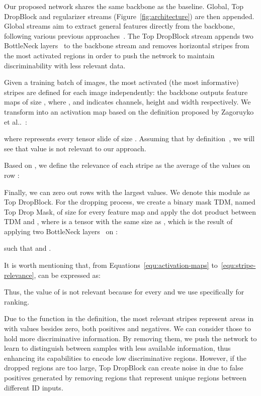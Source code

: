 \documentclass[a4paper,conference]{IEEEtran}
\makeatletter
\DeclareRobustCommand\onedot{\futurelet\@let@token\@onedot}
\def\@onedot{\ifx\@let@token.\else.\null\fi\xspace}
\def\etal{et al\onedot}
\makeatother
\begin{document}
Our proposed network shares the same backbone as the baseline. Global, Top DropBlock and regularizer streams (Figure~\ref{fig:architecture}) are then appended. Global streams aim to extract general features directly from the backbone, following various previous approaches~\cite{quispe2019improved,dai2019batch,luo2019bag}. The Top DropBlock stream appends two BottleNeck layers~\cite{he2016deep} to the backbone stream and removes horizontal stripes from the most activated regions in order to push the network to maintain discriminability with less relevant data.
 
Given a training batch of  images, the most activated (the most informative) stripes are defined for each image independently: the backbone outputs  feature maps  of size , where ,  and  indicates channels, height and width respectively. We transform  into an activation map  based on the definition proposed by Zagoruyko \etal~\cite{zagoruyko2016paying}:

\noindent where  represents every tensor slide of size . Assuming that  by definition~\cite{zagoruyko2016paying}, we will see that  value is not relevant to our approach.

Based on , we define the relevance  of each stripe  as the average of the values on row :

 
Finally, we can zero out rows with the largest  values. We denote this module as Top DropBlock. For the dropping process, we create a binary mask TDM, named Top Drop Mask, of size  for every feature map  and apply the dot product between TDM and , where  is a tensor with the same size as , which is the result of applying two BottleNeck layers~\cite{he2016deep} on :

\noindent such that  and .
 
It is worth mentioning that, from Equations~\ref{equ:activation-maps} to~\ref{equ:stripe-relevance},  can be expressed as:

 
Thus, the value of  is not relevant because  for every  and we use  specifically for ranking.
 
Due to the  function in the  definition, the most relevant stripes represent areas in  with values besides zero, both positives and negatives. We can consider those to hold more discriminative information. By removing them, we push the network to learn to distinguish between samples with less available information, thus enhancing its capabilities to encode low discriminative regions. However, if the dropped regions are too large, Top DropBlock can create noise in  due to false positives generated by removing regions that represent unique regions between different ID inputs.
 
\end{document}
